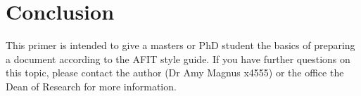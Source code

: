 \documentclass[12pt,letterpaper,oneside]{book}
\begin{document}
	\chapter{Conclusion}
	         This primer is intended to give a masters or PhD student the basics of preparing a \Latex document according to the AFIT style guide\cite{AFITStyle}.  If you have further questions on this topic, please contact the author (Dr Amy Magnus x4555) or the office the Dean of Research for more information. \cite{dumBook,dumArticle}
	         
\backmatter
	\singlespace
	
	 
	\clearpage

   
   
\end{document}
